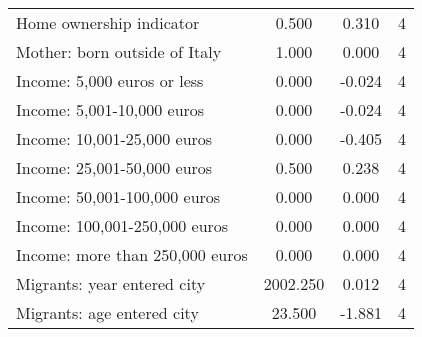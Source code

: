 \begin{table}[htbp]
\begin{tabular}{l*{1}{ccc}}
Home ownership indicator&       0.500         &       0.310&           4\\
Mother: born outside of Italy&       1.000         &       0.000&           4\\
Income: 5,000 euros or less&       0.000         &      -0.024&           4\\
Income: 5,001-10,000 euros&       0.000         &      -0.024&           4\\
Income: 10,001-25,000 euros&       0.000         &      -0.405&           4\\
Income: 25,001-50,000 euros&       0.500         &       0.238&           4\\
Income: 50,001-100,000 euros&       0.000         &       0.000&           4\\
Income: 100,001-250,000 euros&       0.000         &       0.000&           4\\
Income: more than 250,000 euros&       0.000         &       0.000&           4\\
Migrants: year entered city&    2002.250         &       0.012&           4\\
Migrants: age entered city&      23.500         &      -1.881&           4\\
\bottomrule
\end{tabular}
\end{table}
